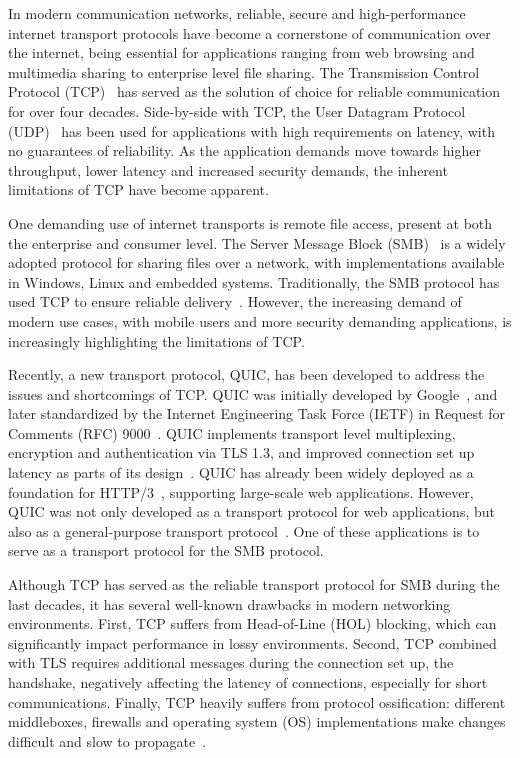 \documentclass[english, 12pt, a4paper, elec, utf8, a-2b, online]{aaltothesis}
\begin{document}
In modern communication networks, reliable, secure and high-performance internet
transport protocols have become a cornerstone of communication over the internet,
being essential for applications ranging from web browsing and multimedia sharing
to enterprise level file sharing. The Transmission Control Protocol (TCP)~\cite{rfc793}
has served as the solution of choice for reliable communication for over four decades.
Side-by-side with TCP, the User Datagram Protocol (UDP)~\cite{rfc768} has been
used for applications with high requirements on latency, with no guarantees of
reliability. As the application demands move towards higher throughput, lower latency
and increased security demands, the inherent limitations of TCP have become apparent.

One demanding use of internet transports is remote file access, present at both
the enterprise and consumer level. The Server Message Block (SMB)~\cite{smb2} is a
widely adopted protocol for sharing files over a network, with implementations available
in Windows, Linux and embedded systems. Traditionally, the SMB protocol has used
TCP to ensure reliable delivery~\cite{smb2}. However, the increasing demand of modern
use cases, with mobile users and more security demanding applications, is increasingly
highlighting the limitations of TCP.

Recently, a new transport protocol, QUIC, has been developed to address
the issues and shortcomings of TCP. QUIC was initially developed by Google~\cite{quic_transport_protocol_design},
and later standardized by the Internet Engineering Task Force (IETF) in Request for Comments (RFC) 9000~\cite{rfc9000}.
QUIC implements transport level multiplexing, encryption and authentication via TLS 1.3, and improved connection
set up latency as parts of its design~\cite{rfc9000,rfc9001}. QUIC has already been
widely deployed as a foundation for HTTP/3~\cite{rfc9114}, supporting large-scale
web applications. However, QUIC was not only developed as a transport protocol for web applications,
but also as a general-purpose transport protocol~\cite{rfc9000}. One of these applications is 
to serve as a transport protocol for the SMB protocol.

Although TCP has served as the reliable transport protocol for SMB during the last
decades, it has several well-known drawbacks in modern networking environments.
First, TCP suffers from Head-of-Line (HOL) blocking, which can significantly
impact performance in lossy environments. Second, TCP combined with TLS requires
additional messages during the connection set up, the handshake, negatively affecting
the latency of connections, especially for short communications. Finally,
TCP heavily suffers from protocol ossification: different middleboxes, firewalls and
operating system (OS) implementations make changes difficult and slow to propagate~\cite{quic_transport_protocol_design}.
\end{document}
